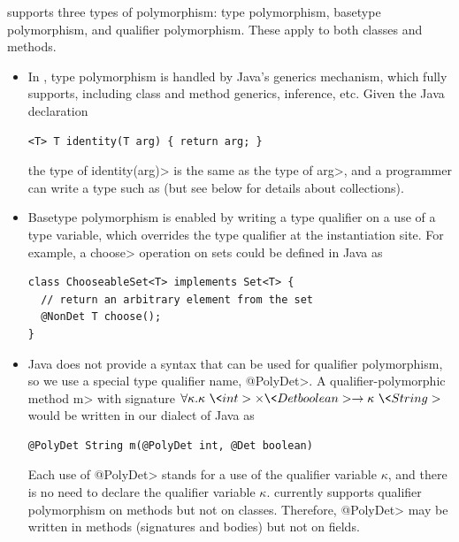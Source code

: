 \OurTypeSystem supports three types of polymorphism:  type
polymorphism, basetype polymorphism, and qualifier polymorphism.
These apply to both classes and methods.
\begin{itemize}
\item
In \theDeterminismCheckerImplementation,
type polymorphism is handled by Java's generics mechanism, which
\theDeterminismChecker fully supports, including class and method generics,
inference, etc.
Given the Java declaration
\begin{Verbatim}
<T> T identity(T arg) { return arg; }
\end{Verbatim}
the type of \<identity(arg)> is the same as the type of
\<arg>, and a programmer can write a type such as  (but see below for details about collections).
\item
Basetype polymorphism is enabled by writing a type qualifier on a use of a
type variable, which overrides the type qualifier at the instantiation
site.
For example, a \<choose> operation on sets could be defined in Java as
\begin{Verbatim}
class ChooseableSet<T> implements Set<T> {
  // return an arbitrary element from the set
  @NonDet T choose();
}
\end{Verbatim}
\item
Java does not provide a syntax that can be used for qualifier polymorphism,
so we use a special type qualifier name, \<@PolyDet>.
A qualifier-polymorphic method \<m> with signature $\forall \kappa . \kappa\ \<int> \times \<Det boolean> \rightarrow
\kappa\ \<String>$ would be written in our dialect of Java as
\begin{Verbatim}
@PolyDet String m(@PolyDet int, @Det boolean)
\end{Verbatim}
Each use of \<@PolyDet> stands for a use of the qualifier variable
$\kappa$, and there is no need to declare the qualifier variable $\kappa$.
\TheDeterminismChecker currently supports
qualifier
polymorphism on methods but not on classes.
Therefore, \<@PolyDet> may be written in methods (signatures and bodies)
but not on fields.
\end{itemize}



